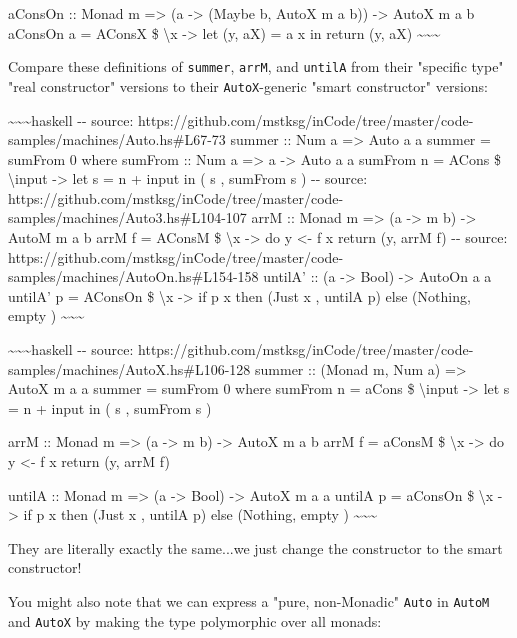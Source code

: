 \documentclass[]{article}
\begin{document}
aConsOn :: Monad m =\textgreater{} (a -\textgreater{} (Maybe b, AutoX m a b))
-\textgreater{} AutoX m a b aConsOn a = AConsX \$ \textbackslash{}x
-\textgreater{} let (y, aX) = a x in return (y, aX)
\textasciitilde{}\textasciitilde{}\textasciitilde{}

Compare these definitions of \texttt{summer}, \texttt{arrM}, and \texttt{untilA}
from their "specific type" "real constructor" versions to their
\texttt{AutoX}-generic "smart constructor" versions:

\textasciitilde{}\textasciitilde{}\textasciitilde{}haskell -\/- source:
https://github.com/mstksg/inCode/tree/master/code-samples/machines/Auto.hs\#L67-73
summer :: Num a =\textgreater{} Auto a a summer = sumFrom 0 where sumFrom :: Num
a =\textgreater{} a -\textgreater{} Auto a a sumFrom n = ACons \$
\textbackslash{}input -\textgreater{} let s = n + input in ( s , sumFrom s )
-\/- source:
https://github.com/mstksg/inCode/tree/master/code-samples/machines/Auto3.hs\#L104-107
arrM :: Monad m =\textgreater{} (a -\textgreater{} m b) -\textgreater{} AutoM m
a b arrM f = AConsM \$ \textbackslash{}x -\textgreater{} do y \textless{}- f x
return (y, arrM f) -\/- source:
https://github.com/mstksg/inCode/tree/master/code-samples/machines/AutoOn.hs\#L154-158
untilA' :: (a -\textgreater{} Bool) -\textgreater{} AutoOn a a untilA' p =
AConsOn \$ \textbackslash{}x -\textgreater{} if p x then (Just x , untilA p)
else (Nothing, empty ) \textasciitilde{}\textasciitilde{}\textasciitilde{}

\textasciitilde{}\textasciitilde{}\textasciitilde{}haskell -\/- source:
https://github.com/mstksg/inCode/tree/master/code-samples/machines/AutoX.hs\#L106-128
summer :: (Monad m, Num a) =\textgreater{} AutoX m a a summer = sumFrom 0 where
sumFrom n = aCons \$ \textbackslash{}input -\textgreater{} let s = n + input in
( s , sumFrom s )

arrM :: Monad m =\textgreater{} (a -\textgreater{} m b) -\textgreater{} AutoX m
a b arrM f = aConsM \$ \textbackslash{}x -\textgreater{} do y \textless{}- f x
return (y, arrM f)

untilA :: Monad m =\textgreater{} (a -\textgreater{} Bool) -\textgreater{} AutoX
m a a untilA p = aConsOn \$ \textbackslash{}x -\textgreater{} if p x then (Just
x , untilA p) else (Nothing, empty )
\textasciitilde{}\textasciitilde{}\textasciitilde{}

They are literally exactly the same...we just change the constructor to the
smart constructor!

You might also note that we can express a "pure, non-Monadic" \texttt{Auto} in
\texttt{AutoM} and \texttt{AutoX} by making the type polymorphic over all
monads:
\end{document}
